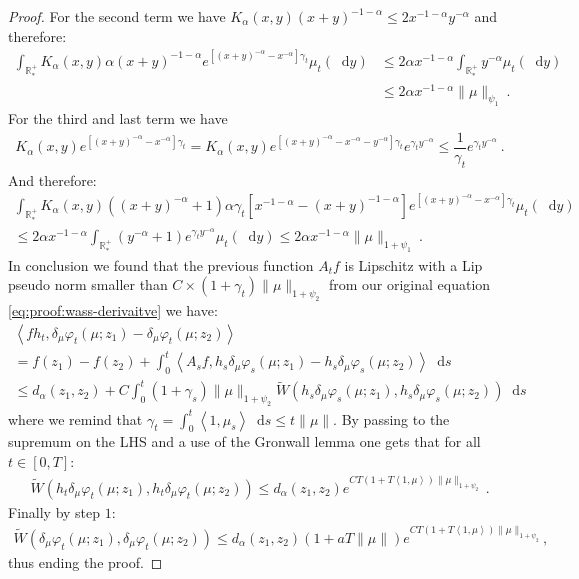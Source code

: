 \documentclass[11pt,a4paper]{article}
\newcommand{\RRP}{\mathbb{R}^+_*}
\newcommand{\brac}[1]{\left\langle#1\right\rangle}
\newcommand{\dd}{\mathop{}\!\mathrm{d}}
\begin{document}
\begin{proof}
    For the second term we have $K_\alpha(x,y)(x+y)^{-1-\alpha} \leq 2x^{-1-\alpha}y^{-\alpha}$ and therefore:
    \begin{align*}
        \int_{\RRP}K_\alpha(x,y)\alpha (x+y)^{-1-\alpha}e^{\left[(x+y)^{-\alpha}-x^{-\alpha}\right]\gamma_t }\mu_t(\dd y)
        &\leq 2\alpha x^{-1-\alpha}\int_{\RRP} y^{-\alpha} \mu_t(\dd y) \\
        &\leq  2\alpha x^{-1-\alpha}\|\mu\|_{\psi_1}\ .
    \end{align*}
    For the third and last term we have 
    \begin{align*}
        K_\alpha(x,y)e^{\left[(x+y)^{-\alpha}-x^{-\alpha}\right]\gamma_t } 
        = K_\alpha(x,y)e^{\left[(x+y)^{-\alpha}-x^{-\alpha}-y^{-\alpha}\right]\gamma_t } e^{\gamma_t y^{-\alpha}} \leq \dfrac{1}{\gamma_t}e^{\gamma_t y^{-\alpha}}\ .
    \end{align*}
    And therefore:
    \begin{multline*}
        \int_{\RRP}K_\alpha(x,y)\left((x+y)^{-\alpha} + 1\right)\alpha\gamma_t\left[x^{-1-\alpha} -(x+y)^{-1-\alpha}\right] e^{\left[(x+y)^{-\alpha}-x^{-\alpha}\right]\gamma_t }\mu_t(\dd y)\\
        \leq 2\alpha x^{-1-\alpha} \int_{\RRP} (y^{-\alpha} + 1)e^{\gamma_t y^{-\alpha}}\mu_t(\dd y)
        \leq 2\alpha x^{-1-\alpha} \|\mu\|_{1 + \psi_1}\ .
    \end{multline*}
    In conclusion we found that the previous function $A_tf$ is Lipschitz with a Lip pseudo norm smaller than $C\times(1 + \gamma_t )\|\mu\|_{1 + \psi_2}$ from our original equation \eqref{eq:proof:wass-derivaitve} we have:
    \begin{multline*}
        \brac{fh_t,\delta_\mu\varphi_t(\mu;z_1) -\delta_\mu\varphi_t(\mu;z_2)} \\
        = f(z_1) - f(z_2) + \int_0^t \brac{A_sf,h_s\delta_\mu\varphi_s(\mu;z_1) - h_s\delta_\mu\varphi_s(\mu;z_2)} \dd s \\
        \leq d_\alpha(z_1,z_2) + C\int_0^t (1 + \gamma_s)\|\mu\|_{1 + \psi_2} \tilde{W}(h_s\delta_\mu\varphi_s(\mu;z_1),h_s\delta_\mu\varphi_s(\mu;z_2)) \dd s 
    \end{multline*}
    where we remind that $\gamma_t = \int_0^t \brac{1,\mu_s} \dd s \leq t\|\mu\|$. By passing to the supremum on the LHS and a use of the Gronwall lemma one gets that for all $t \in [0,T]$:
    \begin{align*}
        \tilde{W}(h_t\delta_\mu\varphi_t(\mu;z_1),h_t\delta_\mu\varphi_t(\mu;z_2)) \leq d_\alpha(z_1,z_2) e^{CT(1 +  T \brac{1,\mu})\|\mu\|_{1 + \psi_2}}\ .
    \end{align*}
    Finally by step $1$:
    \begin{align*}
        \tilde{W}(\delta_\mu\varphi_t(\mu;z_1),\delta_\mu\varphi_t(\mu;z_2)) \leq d_\alpha(z_1,z_2)(1 + aT\|\mu\|) e^{CT(1 +  T \brac{1,\mu})\|\mu\|_{1 + \psi_2}},
    \end{align*}
    thus ending the proof.
\end{proof}
\end{document}
